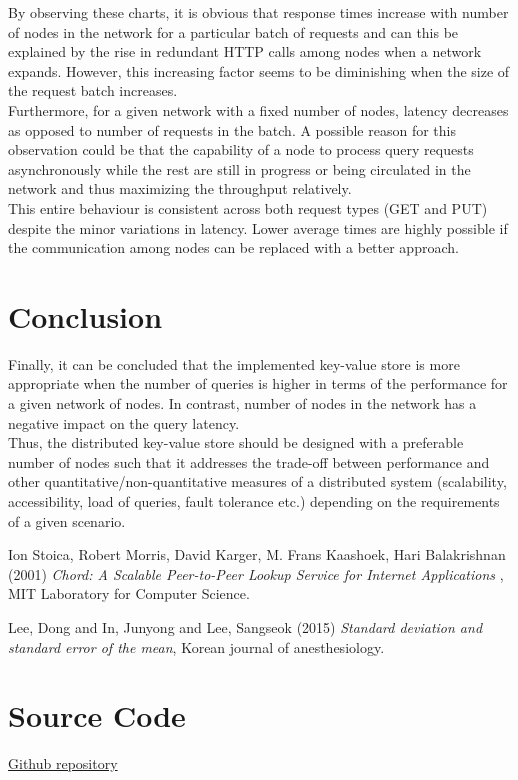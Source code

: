 \documentclass[
    a4paper,
    twocolumn,
]{article}
\begin{document}
By observing these charts, it is obvious that response times increase with number of nodes in the network for a particular batch of requests and can this be explained by the rise in redundant HTTP calls among nodes when a network expands. However, this increasing factor seems to be diminishing when the size of the request batch increases. \\

Furthermore, for a given network with a fixed number of nodes, latency decreases as opposed to number of requests in the batch. A possible reason for this observation could be that the capability of a node to process query requests asynchronously while the rest are still in progress or being circulated in the network and thus maximizing the throughput relatively.\\

This entire behaviour is consistent across both request types (GET and PUT) despite the minor variations in latency. Lower average times are highly possible if the communication among nodes can be replaced with a better approach.

\section{Conclusion}

Finally, it can be concluded that the implemented key-value store is more appropriate when the number of queries is higher in terms of the performance for a given network of nodes. In contrast, number of nodes in the network has a negative impact on the query latency. \\ 

Thus, the distributed key-value store should be designed with a preferable number of nodes such that it addresses the trade-off between performance and other quantitative/non-quantitative measures of a distributed system (scalability, accessibility, load of queries, fault tolerance etc.) depending on the requirements of a given scenario.

\begin{thebibliography}{9}	
	Ion Stoica, Robert Morris, David Karger, M. Frans Kaashoek, Hari Balakrishnan (2001) \emph{Chord: A Scalable Peer-to-Peer Lookup Service for Internet Applications }, MIT Laboratory for Computer Science.
	
	Lee, Dong and In, Junyong and Lee, Sangseok (2015) \emph{Standard deviation and standard error of the mean}, Korean journal of anesthesiology.
\end{thebibliography}

\appendix
\section{Source Code}
\href{https://github.com/YasiruR/dht/tree/master}{Github repository}
\end{document}
